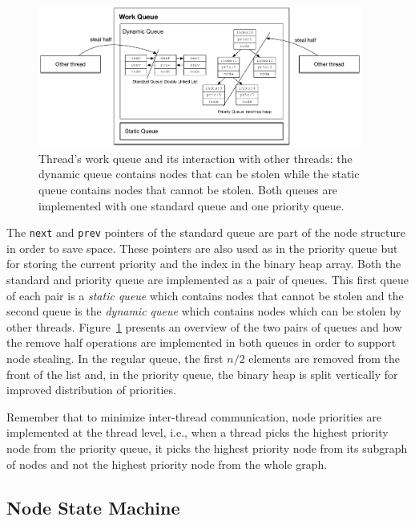 \begin{figure}[t]
\centering
\includegraphics[width=0.95\textwidth]{figures/implementation/work_queue.pdf}
\caption{Thread's work queue and its interaction with other threads: the dynamic queue contains nodes that can be
   stolen while the static queue contains nodes that cannot be stolen. Both
   queues are implemented with one standard queue and one priority queue.}
\label{fig:implementation:work_queue}
\end{figure}

The \texttt{next} and \texttt{prev} pointers of the standard queue are part of
the node structure in order to save space. These pointers are also used as in
the priority queue but for storing the current priority and the index in the
binary heap array. Both the standard and priority queue are implemented as a
pair of queues. This first queue of each pair is a \emph{static queue} which
contains nodes that cannot be stolen and the second queue is the \emph{dynamic
queue} which contains nodes which can be stolen by other threads.
Figure~\ref{fig:implementation:work_queue} presents an overview of the two pairs
of queues and how the remove half operations are implemented in both queues in
order to support node stealing.  In the regular queue, the first $n/2$ elements are
removed from the front of the list and, in the priority queue, the binary heap
is split vertically for improved distribution of priorities.

Remember that to minimize inter-thread communication, node priorities are
implemented at the thread level, i.e., when a thread picks the highest priority
node from the priority queue, it picks the highest priority node from its
subgraph of nodes and not the highest priority node from the whole graph.

\subsection{Node State Machine}\label{sec:node_state_machine}

